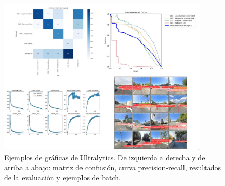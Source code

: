 \begin{figure}[H]
    \centering
    \includegraphics[width=0.9\textwidth]{graphs/metrics_grid.jpg}
    \caption{Ejemplos de gráficas de Ultralytics. De izquierda a derecha y de arriba a abajo: matriz de confusión, curva precision-recall, resultados de la evaluación y ejemplos de batch.}
    \label{fig:Ultralytics_metrics}
\end{figure}

